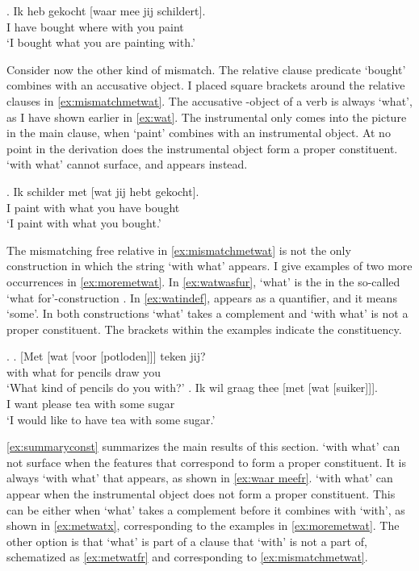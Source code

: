 \documentclass[11pt,a4paper]{article}
\begin{document}
\exg. Ik heb gekocht [waar mee jij schildert].\\
 I have bought where with you paint\\
 `I bought what you are painting with.'\label{ex:mismatchwaarmee}

Consider now the other kind of mismatch. The relative clause predicate  `bought' combines with an accusative object. I placed square brackets around the relative clauses in \ref{ex:mismatchmetwat}. The accusative -object of a verb is always  `what', as I have shown earlier in \ref{ex:wat}. The instrumental only comes into the picture in the main clause, when  `paint' combines with an instrumental object. At no point in the derivation does the instrumental object form a proper constituent.  `with what' cannot surface, and  appears instead.

\exg. Ik schilder met [wat jij hebt gekocht].\\
 I paint with what you have bought\\
 `I paint with what you bought.'\label{ex:mismatchmetwat}

 The mismatching free relative in \ref{ex:mismatchmetwat} is not the only construction in which the string  `with what' appears. I give examples of two more occurrences in \ref{ex:moremetwat}. In \ref{ex:watwasfur},  `what' is the  in the so-called  `what for'-construction \citep[cf.][]{corver1991}.
 In \ref{ex:watindef},  appears as a quantifier, and it means `some'. In both constructions  `what' takes a complement and  `with what' is not a proper constituent. The brackets within the examples indicate the constituency.

 \ex.\label{ex:moremetwat}
 \ag. [Met [wat [voor [potloden]]] teken jij?\\
  with what for pencils draw you\\
  `What kind of pencils do you with?'\label{ex:watwasfur}
 \bg. Ik wil graag thee [met [wat [suiker]]].\\
  I want please tea with some sugar\\
  `I would like to have tea with some sugar.'\label{ex:watindef}

\ref{ex:summaryconst} summarizes the main results of this section.  `with what' can not surface when the features that correspond to  form a proper constituent. It is always  `with what' that appears, as shown in \ref{ex:waar meefr}.  `with what' can appear when the instrumental object does not form a proper constituent.
This can be either when  `what' takes a complement before it combines with  `with', as shown in \ref{ex:metwatx}, corresponding to the examples in \ref{ex:moremetwat}. The other option is that  `what' is part of a clause that  `with' is not a part of, schematized as \ref{ex:metwatfr} and corresponding to \ref{ex:mismatchmetwat}.
\end{document}
